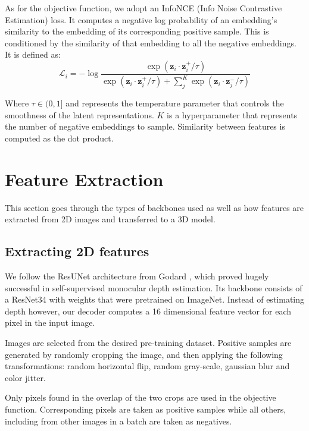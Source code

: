 \documentclass[10pt,twocolumn,letterpaper]{article}
\newcommand{\AJ}[1]{{\color{red}{[Andrej: #1]}}}
\begin{document}
As for the objective function, we adopt an InfoNCE (Info Noise Contrastive Estimation) loss. It computes a negative log probability of an embedding's similarity to the embedding of its corresponding positive sample. This is conditioned by the similarity of that embedding to all the negative embeddings. It is defined as:
\begin{equation}
    \mathcal{L}_{i} = -\log \frac{\exp(\mathbf{z}_{i} \cdot \mathbf{z}^{+}_{i} / \tau)}{\exp(\mathbf{z}_{i} \cdot \mathbf{z}^{+}_{i} / \tau) + \sum^{K}_{j}\exp(\mathbf{z}_{i} \cdot \mathbf{z}^{-}_{j} / \tau)}
    \label{eq:contrastive_loss}
\end{equation}

Where $\tau \in (0,1]$ and represents the temperature parameter that controls the smoothness of the latent representations. $K$ is a hyperparameter that represents the number of negative embeddings to sample. Similarity between features is computed as the dot product.

\section{Feature Extraction}
\label{sec:featureExtraction}

This section goes through the types of backbones used as well as how features are extracted from 2D images and transferred to a 3D model.

\AJ{Need a picture depicting the pipeline}

\subsection{Extracting 2D features}
\label{sec:method:features2d}

We follow the ResUNet architecture from Godard \etal \cite{godard2019Digging}, which proved hugely successful in self-supervised monocular depth estimation. Its backbone consists of a ResNet34 with weights that were pretrained on ImageNet. Instead of estimating depth however, our decoder computes a 16 dimensional feature vector for each pixel in the input image.

Images are selected from the desired pre-training dataset. Positive samples are generated by randomly cropping the image, and then applying the following transformations: random horizontal flip, random gray-scale, gaussian blur and color jitter.

Only pixels found in the overlap of the two crops are used in the objective function. Corresponding pixels are taken as positive samples while all others, including from other images in a batch are taken as negatives.
\end{document}
